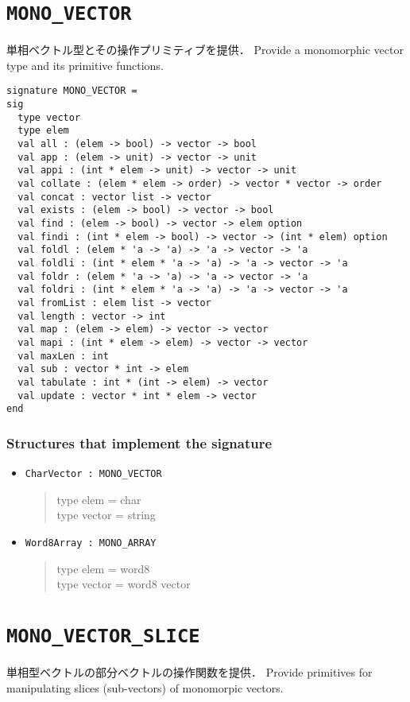 \documentclass{jbook}
\newcommand{\txt}[2]{#2}
\newcommand{\code}[1]{\mbox{\large\tt #1}}
\newenvironment{program}{\begin{quote}\begin{tt}}%
                        {\end{tt}\end{quote}}
\newcommand{\signature}[2]{
\section{{\tt #1}}\label{section:reference:#2}
}
\newcommand{\Structure}{\subsubsection*{\txt{シグネチャを実装するストラクチャ}{Structures that implement the signature}}}
\begin{document}
\signature{MONO\_VECTOR}{MONOVECTOR}
\ifjp%
	単相ベクトル型とその操作プリミティブを提供．
\else%
	Provide a monomorphic vector type and its primitive functions.
\fi%

\begin{verbatim}
signature MONO_VECTOR =
sig
  type vector
  type elem
  val all : (elem -> bool) -> vector -> bool
  val app : (elem -> unit) -> vector -> unit
  val appi : (int * elem -> unit) -> vector -> unit
  val collate : (elem * elem -> order) -> vector * vector -> order
  val concat : vector list -> vector
  val exists : (elem -> bool) -> vector -> bool
  val find : (elem -> bool) -> vector -> elem option
  val findi : (int * elem -> bool) -> vector -> (int * elem) option
  val foldl : (elem * 'a -> 'a) -> 'a -> vector -> 'a
  val foldli : (int * elem * 'a -> 'a) -> 'a -> vector -> 'a
  val foldr : (elem * 'a -> 'a) -> 'a -> vector -> 'a
  val foldri : (int * elem * 'a -> 'a) -> 'a -> vector -> 'a
  val fromList : elem list -> vector
  val length : vector -> int
  val map : (elem -> elem) -> vector -> vector
  val mapi : (int * elem -> elem) -> vector -> vector
  val maxLen : int
  val sub : vector * int -> elem
  val tabulate : int * (int -> elem) -> vector
  val update : vector * int * elem -> vector
end
\end{verbatim}

\Structure
\begin{itemize}
\item \code{CharVector : MONO\_VECTOR}
\begin{program}
    type elem = char
\\
    type vector = string
\end{program}
\item \code{Word8Array : MONO\_ARRAY}
\begin{program}
   type elem = word8
\\
   type vector = word8 vector
\end{program}
\end{itemize}

\signature{MONO\_VECTOR\_SLICE}{MONOVECTORSLICE}
\ifjp%
	単相型ベクトルの部分ベクトルの操作関数を提供．
\else%
	Provide primitives for manipulating slices (sub-vectors) of
monomorpic vectors.
\fi%
\end{document}
